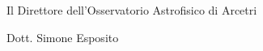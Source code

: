 \begin{flushright}
\begin{minipage}[c]{8cm}
\begin{center}
Il Direttore dell'Osservatorio Astrofisico di Arcetri

Dott. Simone Esposito
\end{center}
\end{minipage}
\end{flushright}

